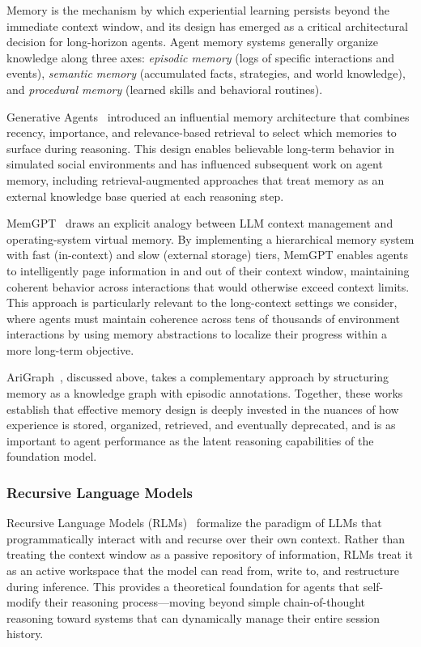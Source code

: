  Memory is the mechanism by which experiential learning persists beyond the immediate context window, and its design has emerged as a critical architectural decision for long-horizon agents. Agent memory systems generally organize knowledge along three axes: \emph{episodic memory} (logs of specific interactions and events), \emph{semantic memory} (accumulated facts, strategies, and world knowledge), and \emph{procedural memory} (learned skills and behavioral routines).

Generative Agents~\citep{park2023generative} introduced an influential memory architecture that combines recency, importance, and relevance-based retrieval to select which memories to surface during reasoning. This design enables believable long-term behavior in simulated social environments and has influenced subsequent work on agent memory, including retrieval-augmented approaches that treat memory as an external knowledge base queried at each reasoning step.

MemGPT~\citep{packer2023memgpt} draws an explicit analogy between LLM context management and operating-system virtual memory. By implementing a hierarchical memory system with fast (in-context) and slow (external storage) tiers, MemGPT enables agents to intelligently page information in and out of their context window, maintaining coherent behavior across interactions that would otherwise exceed context limits. This approach is particularly relevant to the long-context settings we consider, where agents must maintain coherence across tens of thousands of environment interactions by using memory abstractions to localize their progress within a more long-term objective.

AriGraph~\citep{anokhin2024arigraph}, discussed above, takes a complementary approach by structuring memory as a knowledge graph with episodic annotations. Together, these works establish that effective memory design is deeply invested in the nuances of how experience is stored, organized, retrieved, and eventually deprecated, and is as important to agent performance as the latent reasoning capabilities of the foundation model.

\subsubsection{Recursive Language Models}\label{sec:rlm}

Recursive Language Models (RLMs)~\citep{zhang2025rlm} formalize the paradigm of LLMs that programmatically interact with and recurse over their own context. Rather than treating the context window as a passive repository of information, RLMs treat it as an active workspace that the model can read from, write to, and restructure during inference. This provides a theoretical foundation for agents that self-modify their reasoning process---moving beyond simple chain-of-thought reasoning toward systems that can dynamically manage their entire session history.

